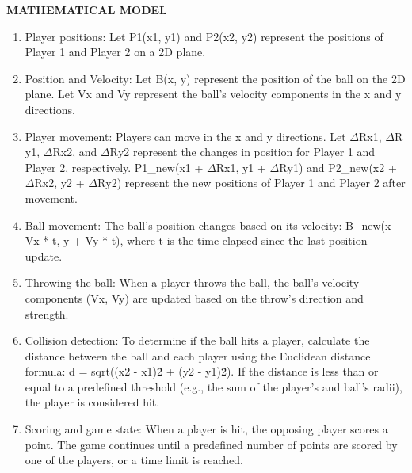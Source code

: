 \documentclass[12pt]{report}
\begin{document}
\large\textbf{MATHEMATICAL MODEL}
\normalsize
\justifying
\setlength{\parindent}{4em}
\setlength{\parskip}{0.5em}
\renewcommand{\baselinestretch}{1.5}
\vspace{0.1cm}
\begin{enumerate}
\item Player positions:
Let P1(x1, y1) and P2(x2, y2) represent the positions of Player 1 and Player 2 on a 2D plane.

\item Position and Velocity:
Let B(x, y) represent the position of the ball on the 2D plane.
Let Vx and Vy represent the ball's velocity components in the x and y directions.

\item Player movement:
Players can move in the x and y directions. Let $\Delta\mathrm{R}$x1, $\Delta\mathrm{R}$y1, $\Delta\mathrm{R}$x2, and $\Delta\mathrm{R}$y2 represent the changes in position for Player 1 and Player 2, respectively.
P1\_new(x1 + $\Delta\mathrm{R}$x1, y1 + $\Delta\mathrm{R}$y1) and P2\_new(x2 + $\Delta\mathrm{R}$x2, y2 + $\Delta\mathrm{R}$y2) represent the new positions of Player 1 and Player 2 after movement.

\item Ball movement:
The ball's position changes based on its velocity: B\_new(x + Vx * t, y + Vy * t), where t is the time elapsed since the last position update.

\item Throwing the ball:
When a player throws the ball, the ball's velocity components (Vx, Vy) are updated based on the throw's direction and strength.

\item Collision detection:
To determine if the ball hits a player, calculate the distance between the ball and each player using the Euclidean distance formula: d = sqrt((x2 - x1)\^2 + (y2 - y1)\^2).
If the distance is less than or equal to a predefined threshold (e.g., the sum of the player's and ball's radii), the player is considered hit.

\item Scoring and game state:
When a player is hit, the opposing player scores a point.
The game continues until a predefined number of points are scored by one of the players, or a time limit is reached.


\end{enumerate}


\clearpage

\vspace{4cm}
\raggedright
\centering
\end{document}
